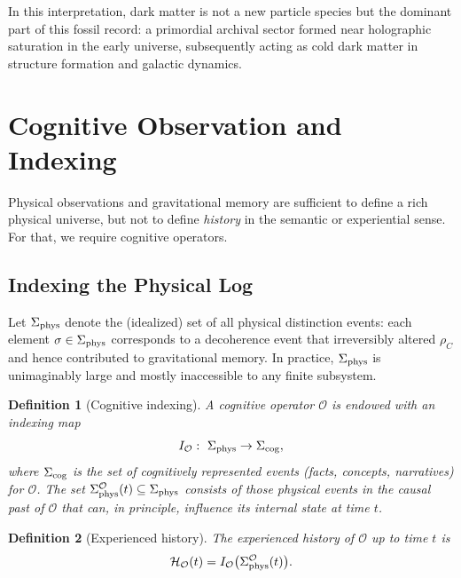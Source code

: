 \documentclass[12pt,a4paper]{article}
\newtheorem{definition}{Definition}
\begin{document}
In this interpretation, dark matter is not a new particle species but the dominant part of this fossil record: a primordial archival sector formed near holographic saturation in the early universe, subsequently acting as cold dark matter in structure formation and galactic dynamics.

\section{Cognitive Observation and Indexing}
\label{sec:cognitive}

Physical observations and gravitational memory are sufficient to define a rich physical universe, but not to define \emph{history} in the semantic or experiential sense. For that, we require cognitive operators.

\subsection{Indexing the Physical Log}
\label{subsec:indexing}

Let $\Sigma_{\rm phys}$ denote the (idealized) set of all physical distinction events: each element $\sigma \in \Sigma_{\rm phys}$ corresponds to a decoherence event that irreversibly altered $\rho_C$ and hence contributed to gravitational memory. In practice, $\Sigma_{\rm phys}$ is unimaginably large and mostly inaccessible to any finite subsystem.

\begin{definition}[Cognitive indexing]
A cognitive operator $\mathcal{O}$ is endowed with an \emph{indexing map}
\begin{equation}
  I_{\mathcal{O}}:\ \Sigma_{\rm phys} \to \Sigma_{\rm cog},
\end{equation}
where $\Sigma_{\rm cog}$ is the set of cognitively represented events (facts, concepts, narratives) for $\mathcal{O}$. The set $\Sigma_{\rm phys}^{\mathcal{O}}(t) \subseteq \Sigma_{\rm phys}$ consists of those physical events in the causal past of $\mathcal{O}$ that can, in principle, influence its internal state at time $t$.
\end{definition}

\begin{definition}[Experienced history]
The \emph{experienced history} of $\mathcal{O}$ up to time $t$ is
\begin{equation}
  \mathcal{H}_{\mathcal{O}}(t) = I_{\mathcal{O}}\bigl(\Sigma_{\rm phys}^{\mathcal{O}}(t)\bigr).
\end{equation}
\end{definition}
\end{document}
